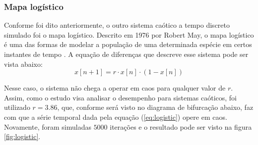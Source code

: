 \documentclass{article}
\begin{document}
\subsubsection{Mapa logístico}

Conforme foi dito anteriormente, o outro sistema caótico a tempo discreto simulado foi o mapa logístico. Descrito em 1976 por Robert May, o mapa logístico é uma das formas de modelar a população de uma determinada espécie em certos instantes de tempo \cite{may1976simple}. A equação de diferenças que descreve esse sistema pode ser vista abaixo:
\begin{equation}\label{eq:logistic}
x[n+1] = r\cdot x[n] \cdot (1 - x[n])
\end{equation}

Nesse caso, o sistema não chega a operar em caos para qualquer valor de $r$. Assim, como o estudo visa analisar o desempenho para sistemas caóticos, foi utilizado $r=3.86$, que, conforme será visto no diagrama de bifurcação abaixo, faz com que a série temporal dada pela equação (\ref{eq:logistic}) opere em caos. Novamente, foram simuladas $5000$ iterações e o resultado pode ser visto na figura \ref{fig:logistic}.
\end{document}
